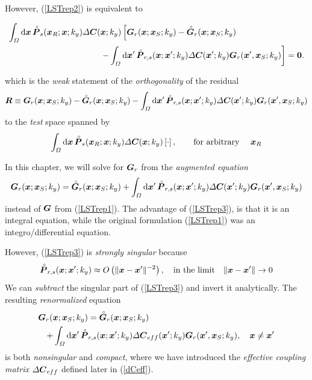 However, (\ref{LSTrep2}) is equivalent to 
\begin{samepage}
\begin{eqnarray} \label{LSTrep30}
\lefteqn{\int_{{\mit \Omega}} {\rm d}{\bmi x}\,{\rf{\bmi P}}_{s}({\bmi x}_{R};{\bmi x};k_y)
{\mit \Delta} {\bmi C}({\bmi
x};k_y)\left[{{\bmi G}}_{r}({\bmi x};{\bmi x}_{S};k_y)-{\rf{\bmi G}}_{r}({\bmi x};{\bmi x}_{S};k_y)
\right.}\nonumber\\
&&\qquad \qquad \qquad \qquad \qquad
\left.-\int_{{\mit \Omega}}{\rm d}{\bmi x}^{\prime}\, 
{\rf{\bmi P}}_{r,s}({\bmi x};{\bmi x}^{\prime};k_y)
{\mit \Delta} {\bmi C}({\bmi
x}^{\prime};k_y) {\bmi G}_{r}({\bmi x}^{\prime},{\bmi 
x}_{S};k_y)\right]= {\bf 0} .
\nonumber
\end{eqnarray}
\end{samepage}
which is the {\em weak\/} statement of the {\em orthogonality\/} of the residual
\[{\bmi R}\equiv
{{\bmi G}}_{r}({\bmi x};{\bmi x}_{S};k_y)-{\rf{\bmi G}}_{r}({\bmi x};{\bmi x}_{S};k_y)
-\int_{{\mit \Omega}}{\rm d}{\bmi x}^{\prime}\, 
{\rf{\bmi P}}_{r,s}({\bmi x};{\bmi x}^{\prime};k_y)
{\mit \Delta} {\bmi C}({\bmi
x}^{\prime};k_y) {\bmi G}_{r}({\bmi x}^{\prime},{\bmi 
x}_{S};k_y)
\] 
 to the {\em test\/} space spanned by
\[
\int_{{\mit \Omega}} {\rm d}{\bmi x}\,{\rf{\bmi P}}_{s}({\bmi x}_{R};{\bmi x};k_y)
{\mit \Delta} {\bmi C}({\bmi
x};k_y) \left[\cdot\right], \qquad \mbox{for arbitrary }\quad {\bmi x}_{R}
\]

In this chapter, we will solve for ${{\bmi G}}_{r}$ from the {\em 
augmented equation\/} 
\begin{equation} \label{LSTrep3}
{{\bmi G}}_{r}({\bmi x};{\bmi x}_{S};k_y)={\rf{\bmi G}}_{r}({\bmi x};{\bmi x}_{S};k_y)
+\int_{{\mit \Omega}}{\rm d}{\bmi x}^{\prime}\, 
{\rf{\bmi P}}_{r,s}({\bmi x};{\bmi x}^{\prime};k_y)
{\mit \Delta} {\bmi C}({\bmi
x}^{\prime};k_y) {\bmi G}_{r}({\bmi x}^{\prime},{\bmi 
x}_{S};k_y)
\end{equation} 
instead of ${{\bmi G}}$ from (\ref{LSTrep1}). The advantage of 
(\ref{LSTrep3}), is that it is an integral equation,  while
 the original formulation (\ref{LSTrep1}) was an integro/differential 
 equation. 

However, (\ref{LSTrep3}) is {\em strongly singular\/} because
\[
{\rf{\bmi P}}_{r,s}({\bmi x};{\bmi x}^{\prime};k_y)\approx 
O\left(\| {\bmi x}-{\bmi x}^{\prime} \|^{-2} \right), \quad \mbox{in the 
limit} \quad \| {\bmi x}-{\bmi x}^{\prime} \|\rightarrow 0
\]
We can {\em subtract \/} the singular part of (\ref{LSTrep3}) and invert 
it analytically. The resulting {\em renormalized\/} equation
\begin{eqnarray} \label{LSTrep4}
\lefteqn{{{\bmi G}}_{r}({\bmi x};{\bmi x}_{S};k_y)={\rf{\bmi 
G}}_{r}({\bmi x};{\bmi x}_{S};k_y)}\nonumber\\
&&
+\int_{{\mit \Omega}}{\rm d}{\bmi x}^{\prime}\, 
{\rf{\bmi P}}_{r,s}({\bmi x};{\bmi x}^{\prime};k_y)
{\mit \Delta} {\bmi C}_{eff}({\bmi
x}^{\prime};k_y) {\bmi G}_{r}({\bmi x}^{\prime},{\bmi 
x}_{S};k_y), \quad {\bmi x}\not={\bmi x}^{\prime}
\end{eqnarray} 
is both {\em nonsingular\/} and {\em compact\/}, where 
we have introduced the {\em effective coupling matrix\/} ${\mit \Delta} 
{\bmi C}_{eff}$ defined later in (\ref{dCeff}).

